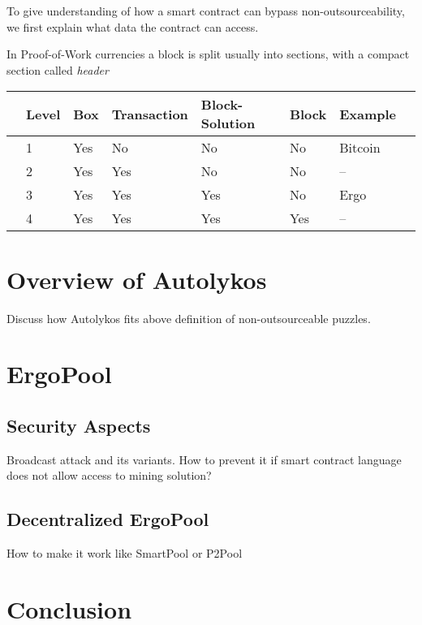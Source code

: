 \documentclass[11pt]{article}
\newcommand{\powname}{Autolykos\xspace}
\newcommand{\poolname}{ErgoPool\xspace}
\begin{document}
To give understanding of how a smart contract can bypass non-outsourceability, we first explain what data the contract
can access.

In Proof-of-Work currencies a block is split usually into sections, with a compact section called {\em header}

\begin{tabular}{llllllll}
	& Level & Box & Transaction & Block-Solution & Block & Example\\\hline
	& 1     & Yes & No          & No  		   & No    & Bitcoin \\
	& 2     & Yes & Yes         & No 		   & No    & --    \\
	& 3     & Yes & Yes         & Yes 		   & No    & Ergo    \\
	& 4     & Yes & Yes         & Yes 		   & Yes   & --    \\
\end{tabular}
	

\section{Overview of \powname}

Discuss how \powname fits above definition of non-outsourceable puzzles.

\section{\poolname}

\subsection{Security Aspects}

Broadcast attack and its variants. How to prevent it if smart contract language does not allow access to mining solution?

\subsection{Decentralized \poolname}

How to make it work like SmartPool or P2Pool

\section{Conclusion}



\appendix
\end{document}

